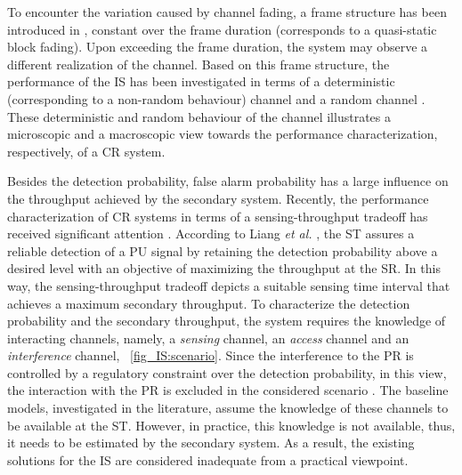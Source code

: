 To encounter the variation caused by channel fading, a frame structure has been introduced in \cite{Liang08},  constant over the frame duration (corresponds to a quasi-static block fading). Upon exceeding the frame duration, the system may observe a different realization of the channel. Based on this frame structure, the performance of the IS has been investigated in terms of a deterministic (corresponding to a non-random behaviour) channel \cite{Liang08, Sharma14}  and a random channel \cite{Alouini03, Herath09}. These deterministic and random behaviour of the channel illustrates a microscopic and a macroscopic view towards the performance characterization, respectively, of a CR system.  %


Besides the detection probability, false alarm probability has a large influence on the throughput achieved by the secondary system. %
Recently, the performance characterization of CR systems in terms of a sensing-throughput tradeoff has received significant attention \cite{Liang08, Juarez11}. According to Liang \textit{et al.} \cite{Liang08}, the ST assures a reliable detection of a PU signal by retaining the detection probability above a desired level with an objective of maximizing the throughput at the SR. In this way, the sensing-throughput tradeoff depicts a suitable sensing time interval that achieves a maximum secondary throughput. To characterize the detection probability and the secondary throughput, the system requires the knowledge of interacting channels, namely, a \textit{sensing} channel, an \textit{access} channel and an \textit{interference} channel,  \figurename~\ref{fig_IS:scenario}. Since the interference to the PR is controlled by a regulatory constraint over the detection probability, in this view, the interaction with the PR is excluded in the considered scenario \cite{Liang08}. The baseline models, investigated in the literature, assume the knowledge of these channels to be available at the ST.
However, in practice, this knowledge is not available, thus, it needs to be estimated by the secondary system. As a result, the existing solutions for the IS are considered inadequate from a practical viewpoint.


